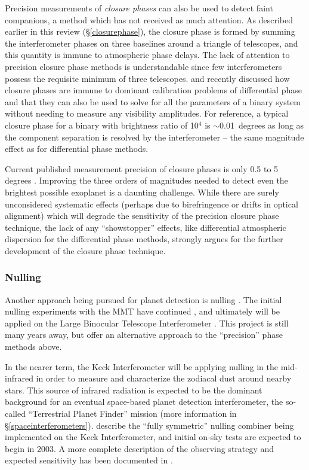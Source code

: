 \documentclass[12pt]{iopart}
\begin{document}
Precision measurements of {\em closure phases} can also be used to
detect faint companions, a method which has not received as much
attention.  As described earlier in this review
(\S\ref{closurephase}), the closure phase is formed by summing the
interferometer phases on three baselines around a triangle of
telescopes, and this quantity is immune to atmospheric phase delays.
The lack of attention to precision closure phase methods is
understandable since few interferometers possess the requisite minimum
of three telescopes.  \citet{monnier2002} and \citet{segransan2002}
recently discussed how closure phases are immune to dominant
calibration problems of differential phase and that they can also be
used to solve for all the parameters of a binary system without
needing to measure any visibility amplitudes.  For reference, a
typical closure phase for a binary with brightness ratio of 10$^4$ is
$\sim$0.01~degrees as long as the component separation is resolved by
the interferometer -- the same magnitude effect as for differential
phase methods.

Current published measurement precision of closure phases is only 0.5
to 5 degrees \citep{tuthill2000, benson1997, young2000b}. Improving
the three orders of magnitudes needed to detect even the brightest
possible exoplanet is a daunting challenge.  While there are surely
unconsidered systematic effects (perhaps due to birefringence or
drifts in optical alignment) which will degrade the sensitivity of the
precision closure phase technique, the lack of any ``showstopper''
effects, like differential atmospheric dispersion for the differential
phase methods, strongly argues for the further development of the
closure phase technique.  

\subsubsection{Nulling}

Another approach being pursued for planet detection is nulling
\citep{bracewell1978}.  The initial nulling experiments with the MMT
\citep{hinz1998} have continued \citep{hinzthesis}, and ultimately
will be applied on the Large Binocular Telescope Interferometer
\citep{hinz2001b}.  This project is still many years away, but offer
an alternative approach to the ``precision'' phase methods above.

In the nearer term, the Keck Interferometer will be applying nulling
in the mid-infrared in order to measure and characterize the zodiacal
dust around nearby stars.  This source of infrared radiation is
expected to be the dominant background for an eventual space-based 
planet detection interferometer, the so-called ``Terrestrial Planet
Finder'' mission (more information in \S\ref{spaceinterferometers}).
\citet{serabyn2001} describe the ``fully symmetric'' nulling combiner
being implemented on the Keck Interferometer, and initial on-sky tests
are expected to begin in 2003.  A more complete description of the
observing strategy and expected sensitivity has been documented in
\citet{kuchner2003}.
\end{document}
